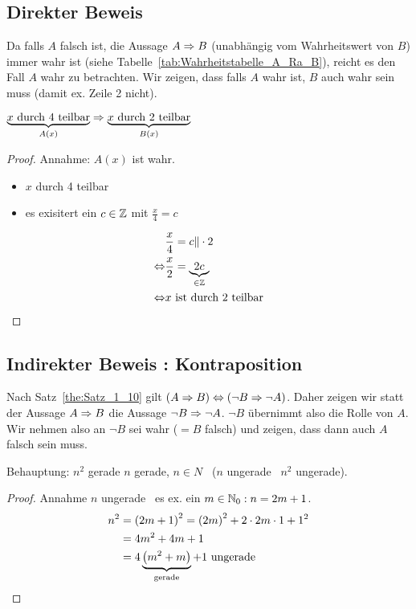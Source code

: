 \subsection{Direkter Beweis}
Da falls $A$ falsch ist, die Aussage $A \Rightarrow B$ (unabhängig vom Wahrheitswert von $B$) immer wahr ist (siehe Tabelle~\vref{tab:Wahrheitstabelle_A_Ra_B}), reicht es den Fall $A$ wahr zu betrachten. Wir zeigen, dass falls $A$ wahr ist, $B$ auch wahr sein muss (damit \ac{ex.} Zeile 2 nicht).

\begin{example}
$\underbrace{x \text{ durch } 4 \text{ teilbar}}_{A(x)} \Rightarrow \underbrace{x \text{ durch } 2 \text{ teilbar}}_{B(x)}$
\end{example}

\begin{proof}
Annahme: $A(x)$ ist wahr.
\begin{itemize}[label=$\Lra$]
\item $x$ durch 4 teilbar
\item es exisitert ein $c \in \mathbb{Z}$ mit $\frac{x}{4} = c$
\end{itemize}

\begin{align*}
&\frac{x}{4} = c \Vert \cdot 2\\
\Leftrightarrow &\frac{x}{2} = \underbrace{2c}_{\in \mathbb{Z}}\\
\Leftrightarrow &x \text{ ist durch 2 teilbar}
\end{align*}
\end{proof}

\subsection{Indirekter Beweis : Kontraposition}
Nach Satz~\vref{the:Satz_1_10} gilt $\left(A \Rightarrow B\right) \Leftrightarrow \left(\neg B \Rightarrow \neg A\right)$. Daher zeigen wir statt der Aussage $A \Rightarrow B$ die Aussage $\neg B \Rightarrow \neg A$. $\neg B$ übernimmt also die Rolle von $A$. Wir nehmen also an $\neg B$ sei wahr ($= B$ falsch) und zeigen, dass dann auch $A$ falsch sein muss.

\begin{example}
Behauptung: $n^2$ gerade \Ra $n$ gerade, $n \in N$ \Lra\ ($n$ ungerade \Ra\ $n^2$ ungerade).
\end{example}

\begin{proof}
Annahme $n$ ungerade \Lra\ es \ac{ex.} ein $m \in \mathbb{N}_0 : n = 2m + 1$.
\begin{align*}
n^2 &= \left(2m + 1\right)^2 = \left(2m\right)^2 + 2 \cdot 2m \cdot 1 + 1^2\\
&= 4m^2 + 4m + 1\\
&= 4 \underbrace{\left(m^2 + m\right)}_{\text{gerade}} + 1 \text{ ungerade}
\end{align*}
\end{proof}

